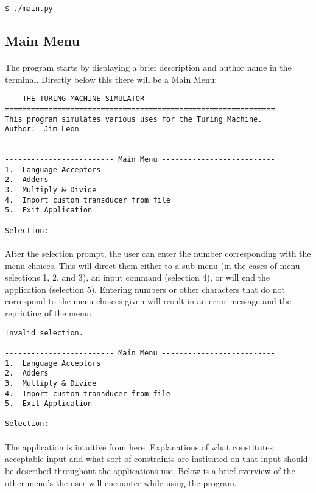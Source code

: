 \documentclass[12pt]{article}
\begin{document}
\begin{verbatim}
$ ./main.py
\end{verbatim}

\subsection{Main Menu}
\paragraph{}
The program starts by displaying a brief description and author name in the 
terminal.  Directly below this there will be a Main Menu:

\begin{verbatim}
    THE TURING MACHINE SIMULATOR
==============================================================
This program simulates various uses for the Turing Machine.  
Author:  Jim Leon


------------------------- Main Menu --------------------------
1.  Language Acceptors
2.  Adders
3.  Multiply & Divide
4.  Import custom transducer from file
5.  Exit Application

Selection:  
\end{verbatim}

\paragraph{}
After the selection prompt, the user can enter the number corresponding with 
the menu choices.  This will direct them either to a sub-menu (in the cases of
menu selections 1, 2, and 3), an input command (selection 4), or will end the 
application (selection 5).  Entering numbers or other characters that do not 
correspond to the menu choices given will result in an error message and the 
reprinting of the menu:

\begin{verbatim}
Invalid selection.

------------------------- Main Menu --------------------------
1.  Language Acceptors
2.  Adders
3.  Multiply & Divide
4.  Import custom transducer from file
5.  Exit Application

Selection:     
\end{verbatim}
\paragraph{}
The application is intuitive from here.  Explanations of what constitutes 
acceptable input and what sort of constraints are instituted on that input 
should be described throughout the applications use.  Below is a brief overview 
of the other menu's the user will encounter while using the program.
\end{document}
